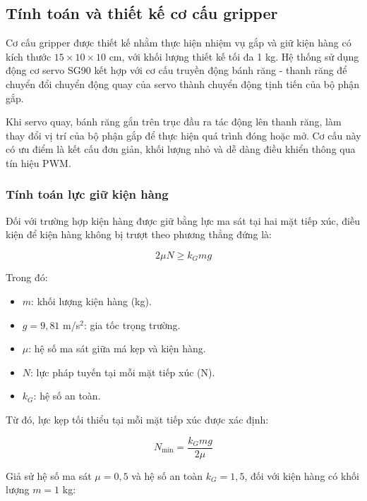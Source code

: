 \subsection{Tính toán và thiết kế cơ cấu gripper}

Cơ cấu gripper được thiết kế nhằm thực hiện nhiệm vụ
gắp và giữ kiện hàng có kích thước
$15 \times 10 \times 10$ cm, với khối lượng thiết kế
tối đa 1 kg. Hệ thống sử dụng động cơ servo SG90
kết hợp với cơ cấu truyền động bánh răng - thanh răng
để chuyển đổi chuyển động quay của servo thành chuyển
động tịnh tiến của bộ phận gắp.

Khi servo quay, bánh răng gắn trên trục đầu ra
tác động lên thanh răng, làm thay đổi vị trí của
bộ phận gắp để thực hiện quá trình đóng hoặc mở.
Cơ cấu này có ưu điểm là kết cấu đơn giản,
khối lượng nhỏ và dễ dàng điều khiển thông qua
tín hiệu PWM.

\subsubsection{Tính toán lực giữ kiện hàng}

Đối với trường hợp kiện hàng được giữ bằng lực
ma sát tại hai mặt tiếp xúc, điều kiện để kiện
hàng không bị trượt theo phương thẳng đứng là:

\begin{equation}
    2\mu N \geq k_G mg
    \label{eq:gripper_force}
\end{equation}

Trong đó:
\begin{itemize}
    \item $m$: khối lượng kiện hàng (kg).
    \item $g = 9{,}81$ m/s$^2$: gia tốc trọng trường.
    \item $\mu$: hệ số ma sát giữa má kẹp và kiện hàng.
    \item $N$: lực pháp tuyến tại mỗi mặt tiếp xúc (N).
    \item $k_G$: hệ số an toàn.
\end{itemize}

Từ đó, lực kẹp tối thiểu tại mỗi mặt tiếp xúc
được xác định:

\begin{equation}
    N_{\min} = \frac{k_G mg}{2\mu}
    \label{eq:gripper_normal_force}
\end{equation}

Giả sử hệ số ma sát $\mu = 0{,}5$ và hệ số
an toàn $k_G = 1{,}5$, đối với kiện hàng
có khối lượng $m = 1$ kg:


